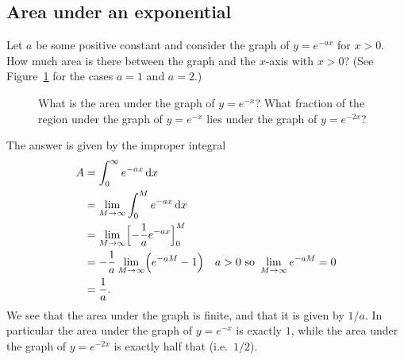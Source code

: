 \subsection{Area under an exponential} Let $a$ be some positive constant and %
consider the graph of $y= e^{-ax}$ for $x>0$.  How much area is there between
the graph and the $x$-axis with $x>0$?  (See
Figure~\ref{fig:02areasunderexponentials} for the cases $a=1$ and $a=2$.)
\begin{figure}[htb]
  
  \caption{What is the area under the graph of $y=e^{-x}$?  What fraction of
    the region under the graph of $y=e^{-x}$ lies under the graph of
    $y=e^{-2x}$?}
  \label{fig:02areasunderexponentials}
\end{figure}
The answer is given by the improper integral
\begin{align*}
  A &= \int_0^\infty e^{-ax} \,\mathrm{d} x \\
  &= \lim_{M\to\infty} \int_0^M e^{-ax} \,\mathrm{d} x \\
  &= \lim_{M\to\infty}\Bigl[-\frac{1} {a}e^{-ax}\Bigr]_0^M\\
  &= -\frac{1} {a}\lim_{M\to\infty} \Bigl( e^{-aM}-1 \Bigr)
       & a>0 \text{ so }\lim_{M\to\infty} e^{-aM} = 0\\
  &= \frac{1} {a}.
\end{align*}
We see that the area under the graph is finite, and that it is given by $1/a$.
In particular the area under the graph of $y=e^{-x}$ is exactly $1$, while the
area under the graph of $y=e^{-2x}$ is exactly half that (i.e.~$1/2$).

